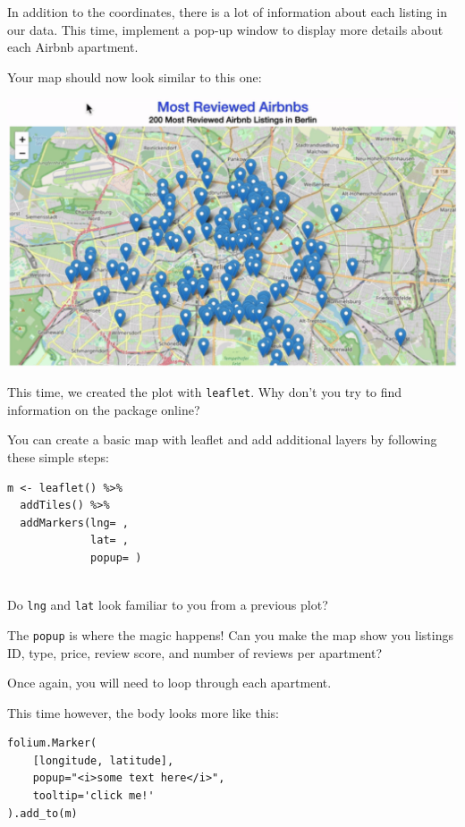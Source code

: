 \documentclass[
  11pt,
]{article}
\newenvironment{tips}[1]
  {
  \begin{itemize}
  \footnotesize
  \renewcommand{\labelitemi}{
    \raisebox{-.7\height}[0pt][0pt]{
      {\setkeys{Gin}{width=3em,keepaspectratio}
        \texttt{[image: images/\#1.png]}}
    }
  }
  \setlength{\fboxsep}{1em}
  \begin{rbox}
  \item
  }
  {
  \end{rbox}
  \end{itemize}
  }
\newenvironment{tipsp}[1]
  {
  \begin{itemize}
  \footnotesize
  \renewcommand{\labelitemi}{
    \raisebox{-.7\height}[0pt][0pt]{
      {\setkeys{Gin}{width=3em,keepaspectratio}
        \texttt{[image: images/\#1.png]}}
    }
  }
  \setlength{\fboxsep}{1em}
  \begin{pbox}
  \item
  }
  {
  \end{pbox}
  \end{itemize}
  }
\begin{document}
In addition to the coordinates, there is a lot of information about each listing in our data.
This time, implement a pop-up window to display more details about each Airbnb apartment.

Your map should now look similar to this one:

\begin{center}\includegraphics[width=1\linewidth]{plot/01_python/map_popup} \end{center}

\begin{tips}r
This time, we created the plot with \texttt{leaflet}.
Why don't you try to find information on the package online?

You can create a basic map with leaflet and add additional layers by following these simple steps:

\begin{verbatim}
m <- leaflet() %>%
  addTiles() %>% 
  addMarkers(lng= , 
             lat= , 
             popup= )
           
\end{verbatim}

Do \texttt{lng} and \texttt{lat} look familiar to you from a previous plot?

The \texttt{popup} is where the magic happens!
Can you make the map show you listings ID, type, price, review score, and number of reviews per apartment?

\end{tips}

\begin{tipsp}p

Once again, you will need to loop through each apartment.

This time however, the body looks more like this:

\begin{verbatim}
folium.Marker(
    [longitude, latitude], 
    popup="<i>some text here</i>", 
    tooltip='click me!'
).add_to(m)
\end{verbatim}

\end{tipsp}
\end{document}
